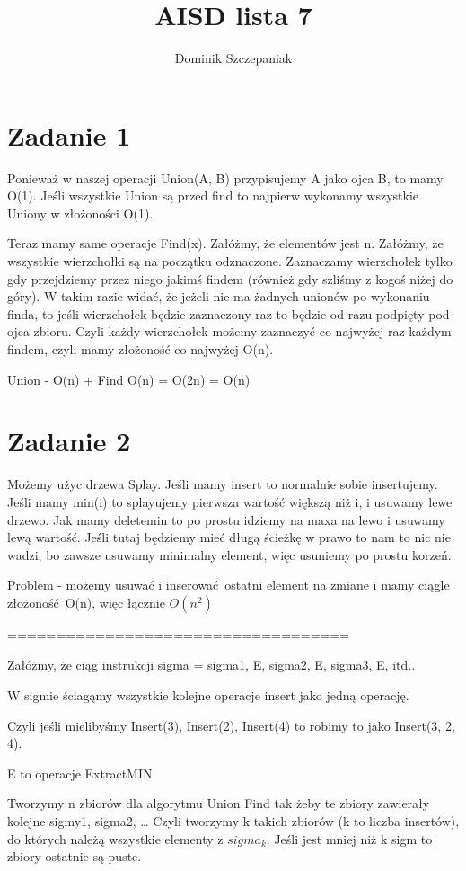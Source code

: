 \documentclass[12pt]{article}
\title{AISD lista 7}
\author{Dominik Szczepaniak}
\begin{document}
\maketitle

\bgroup\obeylines

\section{Zadanie 1}
Ponieważ w naszej operacji Union(A, B) przypisujemy A jako ojca B, to mamy O(1). Jeśli wszystkie Union są przed find to najpierw wykonamy wszystkie Uniony w złożoności O(1). 

Teraz mamy same operacje Find(x). Załóżmy, że elementów jest n. Załóżmy, że wszystkie wierzchołki są na początku odznaczone. Zaznaczamy wierzchołek tylko gdy przejdziemy przez niego jakimś findem (również gdy szliśmy z kogoś niżej do góry). W takim razie widać, że jeżeli nie ma żadnych unionów po wykonaniu finda, to jeśli wierzchołek będzie zaznaczony raz to będzie od razu podpięty pod ojca zbioru. Czyli każdy wierzchołek możemy zaznaczyć co najwyżej raz każdym findem, czyli mamy złożoność co najwyżej O(n).

Union - O(n) + Find O(n) = O(2n) = O(n)
\section{Zadanie 2}
Możemy użyc drzewa Splay. Jeśli mamy insert to normalnie sobie insertujemy. Jeśli mamy min(i) to splayujemy pierwsza wartość większą niż i, i usuwamy lewe drzewo. Jak mamy deletemin to po prostu idziemy na maxa na lewo i usuwamy lewą wartość. Jeśli tutaj będziemy mieć długą ścieżkę w prawo to nam to nic nie wadzi, bo zawsze usuwamy minimalny element, więc usuniemy po prostu korzeń. 


Problem - możemy usuwać i inserować ostatni element na zmiane i mamy ciągle złożoność O(n), więc łącznie $O(n^2)$

===================================

Załóżmy, że ciąg instrukcji sigma = sigma1, E, sigma2, E, sigma3, E, itd.. 

W sigmie ściagąmy wszystkie kolejne operacje insert jako jedną operację.

Czyli jeśli mielibyśmy Insert(3), Insert(2), Insert(4) to robimy to jako Insert(3, 2, 4).

E to operacje ExtractMIN 

Tworzymy n zbiorów dla algorytmu Union Find tak żeby te zbiory zawierały kolejne sigmy1, sigma2, \dots
Czyli tworzymy k takich zbiorów (k to liczba insertów), do których należą wszystkie elementy z $sigma_k$. Jeśli jest mniej niż k sigm to zbiory ostatnie są puste.
\end{document}
